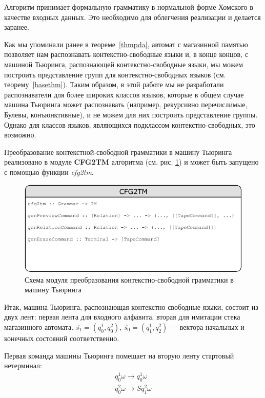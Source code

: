 \documentclass[14pt]{matmex-diploma-custom}
\begin{document}
Алгоритм принимает формальную грамматику в нормальной форме Хомского в качестве входных данных.
Это необходимо для облегчения реализации и делается заранее.

Как мы упоминали ранее в теореме~\ref{thmpda}, автомат с магазинной памятью позволяет нам распознавать контекстно-свободные языки и, в конце концов, с машиной Тьюринга, распознающей контекстно-свободные языки, мы можем построить представление групп для контекстно-свободных языков
(см. теорему~\ref{basethm}). 
Таким образом, в этой работе мы не разработали распознаватели для более 
широких классов языков, которые в общем случае машина Тьюринга может распознавать 
(например, рекурсивно перечислимые, Булевы, конъюнктивные), и не можем для них 
построить представление группы. Однако для классов языков, являющихся подклассом 
контекстно-свободных, это возможно. 

Преобразование контекстной-свободной грамматики в машину Тьюринга реализовано в модуле \textbf{CFG2TM} алгоритма (см. рис. \ref{fig:cfg2tm}) и может быть запущено с помощью функции \textit{cfg2tm}. 

\begin{figure}[H]
\centering
  \includegraphics[width=\linewidth]{pics/cfg2tm.pdf}
  \caption{Схема модуля преобразования контекстно-свободной грамматики в машину Тьюринга}
  \label{fig:cfg2tm}
\end{figure}

Итак, машина Тьюринга, распознающая контекстно-свободные языки, состоит из двух лент: первая
лента для входного алфавита, вторая для имитации стека магазинного автомата. 
$\overline{s_1} = (q_0^1, q_0^2)$, $\overline{s_0} = (q_1^1, q_2^2)$ --- вектора начальных и конечных
состояний соответственно. 

Первая команда машины Тьюринга помещает на вторую ленту стартовый нетерминал:
$$\begin{array}{lcl}
    q_0^1 \omega \to q_0^1 \omega \\
    q_0^2 \omega \to S q_1^2 \omega 
\end{array}$$
\end{document}
